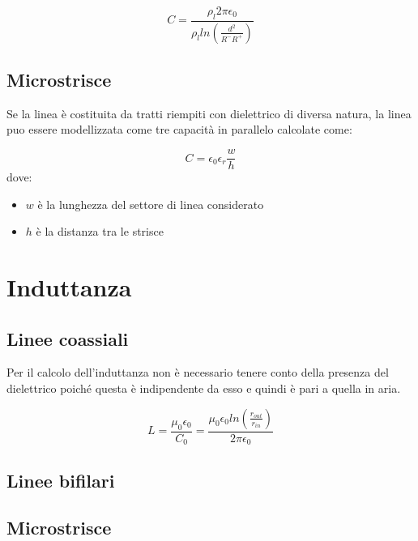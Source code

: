 \documentclass[10pt,a4paper]{report}
\begin{document}
			\begin{equation}
			C=\frac{\rho_l 2 \pi \epsilon_0}{\rho_l ln(\frac{d^2}{R^-R^+})}
			\end{equation}



		\subsection{Microstrisce}

	

	 		Se la linea è costituita da tratti riempiti con dielettrico di diversa natura, la linea puo essere modellizzata come tre capacità in parallelo calcolate come:

	 		\begin{equation}
			C=\epsilon_0 \epsilon_r\frac{w}{h}	 			
	 		\end{equation} 
	 		dove:
	 		\begin{itemize}
	 		\item $w$ è la lunghezza del settore di linea considerato
	 		\item $h$ è la distanza tra le strisce
	 		\end{itemize}


	\section{Induttanza}

		\subsection{Linee coassiali}

			Per il calcolo dell’induttanza non è necessario tenere conto della presenza del dielettrico
			poiché questa è indipendente da esso e quindi è pari a quella in aria.
		
			\begin{equation}
				L=\frac{\mu_0 \epsilon_0}{C_0}=\frac{\mu_0 \epsilon_0 ln (\frac { r_{out}} {r_{in} } )}{2\pi \epsilon_0}
			\end{equation}



		\subsection{Linee bifilari}

		\subsection{Microstrisce}
			
\end{document}
